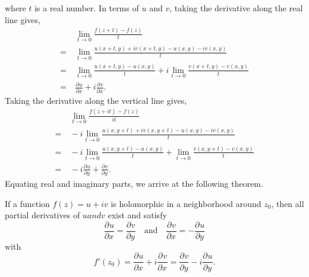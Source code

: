 \documentclass[11pt]{article}
\newcommand*{\pd}[3][]{\ensuremath{\frac{\partial^{#1} #2}{\partial #3^{#1}}}}
\begin{document}
where $t$ is a real number. In terms of $u$ and $v$, taking the derivative along
the real line gives,
\begin{align*}
&\>\lim_{t\to 0} \frac{f(z+t) - f(z)}{t}\\
=&\> \lim_{t\to 0} \frac{u(x+t,y) + iv(x+t,y) - u(x,y) - iv(x,y)}{t}\\
=&\> \lim_{t\to 0} \frac{u(x+t,y) - u(x,y)}{t} + i\lim_{t\to 0} \frac{v(x+t,y) - 
v(x,y)}{t}\\
=&\> \pd{u}{x} + i \pd{v}{x}.
\end{align*}
Taking the derivative along the vertical line gives,
\begin{align*}
&\>\lim_{t\to 0} \frac{f(z+it) - f(z)}{it}\\
=&\> -i\lim_{t\to 0} \frac{u(x,y+t) + iv(x,y+t) - u(x,y) - iv(x,y)}{t}\\
=&\> -i\lim_{t\to 0} \frac{u(x,y+t) - u(x,y)}{t} + \lim_{t\to 0} \frac{v(x,y+t) - 
v(x,y)}{t}\\
=&\> -i\pd{u}{y} + \pd{v}{y}.
\end{align*}
Equating real and imaginary parts, we arrive at the following theorem.
\begin{theorem}
If a function $f(z) = u + iv$ is holomorphic in a neighborhood around $z_0$,
then all partial derivatives of $u and v$ exist and satisfy
\begin{equation*}
\pd{u}{x} = \pd{v}{y} \quad \text{and} \quad \pd{v}{x} = - \pd{u}{y}
\end{equation*}
with
\begin{equation*}
f'(z_0) = \pd{u}{x} + i \pd{v}{x} = \pd{v}{y} - i\pd{u}{y}.
\end{equation*}
\end{theorem}
\end{document}
